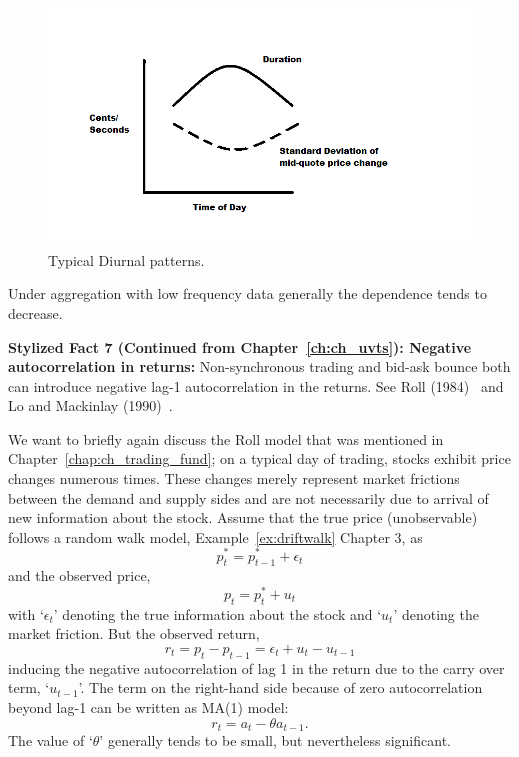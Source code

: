 	\begin{figure}[!ht]
	\centering
	\includegraphics[width=\textwidth]{chapters/chapter_advanced/figures/Sec2-10Fig8.png}	
	\caption{Typical Diurnal patterns. \label{fig:diurnal}}
	\end{figure}

Under aggregation with low frequency data generally the dependence tends to decrease.\twomedskip

\noindent\textbf{Stylized Fact 7 (Continued from Chapter~\ref{ch:ch_uvts}): Negative autocorrelation in returns:} Non-synchronous trading and bid-ask bounce both can introduce negative lag-1 autocorrelation in the returns. See Roll (1984)~\cite{roll1984} and Lo and Mackinlay (1990)~\cite{lo1990}.\twomedskip


We want to briefly again discuss the Roll model that was mentioned in Chapter~\ref{chap:ch_trading_fund}; on a typical day of trading, stocks exhibit price changes numerous times. These changes merely represent market frictions between the demand and supply sides and are not necessarily due to arrival of new information about the stock. Assume that the true price (unobservable) follows a random walk model, Example~\ref{ex:driftwalk} Chapter 3, as
	\begin{equation} \label{eqn:2plowstar}
	p_t^*=p_{t-1}^* + \epsilon_t 
	\end{equation}
and the observed price,
	\begin{equation} \label{eqn:2lowpstar}
	p_t = p_t^* + u_t
	\end{equation}
with `$\epsilon_t$' denoting the true information about the stock and `$u_t$' denoting the market friction. But the observed return,
	\begin{equation} \label{eqn:2firstrtlow}
	r_t=p_t-p_{t-1} = \epsilon_t + u_t - u_{t-1}
	\end{equation}
inducing the negative autocorrelation of lag 1 in the return due to the carry over term, `$u_{t-1}$'. The term on the right-hand side because of zero autocorrelation beyond lag-1 can be written as MA(1) model:
	\begin{equation} \label{eqn:2lowrt}
	r_t=a_t - \theta a_{t-1}.
	\end{equation}
The value of `$\theta$' generally tends to be small, but nevertheless significant. \twomedskip


